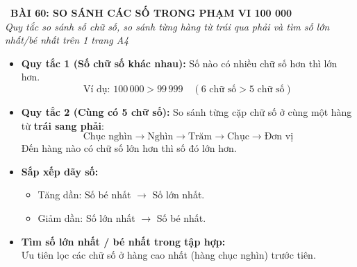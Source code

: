 \documentclass[11pt,a4paper]{article}
\begin{document}
\begin{tcolorbox}[
  enhanced,
  colback=white,
  colframe=primary,
  arc=3mm,
  boxrule=1.2pt,
  left=4mm, right=4mm, top=2.5mm, bottom=2.5mm,
  drop shadow=black!10!white
]
  \centering
  {\Large\bfseries\color{primary}\faBookmark\ BÀI 60: SO SÁNH CÁC SỐ TRONG PHẠM VI 100 000}\\[1.5mm]
  {\small\itshape\color{black!75}Quy tắc so sánh số chữ số, so sánh từng hàng từ trái qua phải và tìm số lớn nhất/bé nhất trên 1 trang A4}
\end{tcolorbox}

\vspace{-2mm}


\noindent
\begin{minipage}[t]{0.49\textwidth}\vspace{0pt}
\begin{tcolorbox}[
  enhanced,
  colback=blue!4!white,
  colframe=blue!75!black,
  arc=2mm, boxrule=0.8pt,
  left=2mm, right=2mm, top=1.8mm, bottom=1.8mm,
  title={\footnotesize\bfseries\color{white}\faKey\ 1. Hai quy tắc so sánh tổng quát}
]
{\footnotesize
\begin{itemize}\setlength{\itemsep}{1.5pt}\setlength{\leftskip}{-2.5mm}
  \item \textbf{Quy tắc 1 (Số chữ số khác nhau):}
  Số nào có nhiều chữ số hơn thì lớn hơn.
  $$\text{Ví dụ: } 100\,000 > 99\,999 \quad (6 \text{ chữ số} > 5 \text{ chữ số})$$
  \item \textbf{Quy tắc 2 (Cùng có 5 chữ số):}
  So sánh từng cặp chữ số ở cùng một hàng từ \textbf{trái sang phải}:
  $$\text{Chục nghìn} \to \text{Nghìn} \to \text{Trăm} \to \text{Chục} \to \text{Đơn vị}$$
  Đến hàng nào có chữ số lớn hơn thì số đó lớn hơn.
\end{itemize}
}
\end{tcolorbox}
\end{minipage}
\hfill
\begin{minipage}[t]{0.49\textwidth}\vspace{0pt}
\begin{tcolorbox}[
  enhanced,
  colback=teal!4!white,
  colframe=teal!75!black,
  arc=2mm, boxrule=0.8pt,
  left=2mm, right=2mm, top=1.8mm, bottom=1.8mm,
  title={\footnotesize\bfseries\color{white}\faSliders\ 2. Kĩ năng sắp xếp và chọn số}
]
{\footnotesize
\begin{itemize}\setlength{\itemsep}{1.5pt}\setlength{\leftskip}{-2.5mm}
  \item \textbf{Sắp xếp dãy số:}
  \begin{itemize}\setlength{\itemsep}{0.5pt}\setlength{\leftskip}{-2.5mm}
    \item Tăng dần: Số bé nhất $\to$ Số lớn nhất.
    \item Giảm dần: Số lớn nhất $\to$ Số bé nhất.
  \end{itemize}
  \item \textbf{Tìm số lớn nhất / bé nhất trong tập hợp:}\\
  Ưu tiên lọc các chữ số ở hàng cao nhất (hàng chục nghìn) trước tiên.
\end{itemize}
}
\end{tcolorbox}
\end{minipage}
\end{document}
